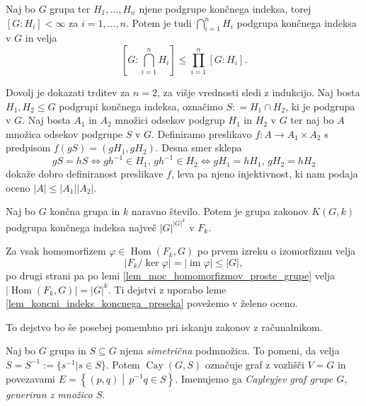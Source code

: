 \begin{lema}\label{lem_koncni_indeks_koncnega_preseka}
Naj bo $G$ grupa ter $H_1, \ldots, H_n$ njene podgrupe končnega indeksa, torej $[G: H_i] < \infty$ za $i = 1, \ldots, n$. Potem je tudi $\bigcap_{i = 1}^{n} H_i$ podgrupa končnega indeksa v $G$ in velja
\begin{equation*}
\left[ G: \bigcap_{i = 1}^{n} H_i \right]  \le \prod_{i=1}^{n} [G: H_i].  
\end{equation*} 
\end{lema}

\begin{dokaz}
Dovolj je dokazati trditev za $n = 2$, za višje vrednosti sledi z indukcijo. Naj bosta $H_1, H_2 \le G$ podgrupi končnega indeksa, označimo $S: = H_1 \cap H_2$, ki je podgrupa v $G$. Naj bosta $A_1$ in $A_2$ množici odsekov podgrup $H_1$ in $H_2$ v $G$ ter naj bo $A$ množica odsekov podgrupe $S$ v $G$.
 Definiramo preslikavo $f \colon A \to  A_1 \times A_2$ s predpisom $f(g S ) = (g H_1, g H_2)$. Desna smer sklepa \begin{equation*}
 g S = h S \iff gh^{-1} \in H_1, \, gh^{-1} \in H_2  \iff g H_1 = h H_1, \, g H_2 = h H_2
\end{equation*}  
dokaže dobro definiranost preslikave $f$, leva pa njeno injektivnost, ki nam podaja oceno $\lvert A \rvert \le  \lvert A_1 \rvert \lvert A_2 \rvert $.    
\end{dokaz}

\begin{posledica}
\label{psl_koncni_indeks_preseka}
Naj bo $G$ končna grupa in $k$ naravno število. Potem je grupa zakonov $K(G, k)$ podgrupa končnega indeksa največ $\lvert G \rvert^{ \lvert G \rvert^k}$ v $F_k$.
\end{posledica}
\begin{dokaz}
  Za vsak homomorfizem $\varphi \in \operatorname{Hom}(F_k, G)$ po prvem izreku o izomorfizmu velja \begin{equation*}
    \lvert F_k / \ker \varphi \rvert = \lvert \operatorname{im} \varphi \rvert \le \lvert G \rvert, 
\end{equation*}
po drugi strani pa po lemi \ref{lem_moc_homomorfizmov_proste_grupe} velja $\lvert \operatorname{Hom}(F_k, G) \rvert = \lvert G \rvert^k$. Ti dejstvi z uporabo leme \ref{lem_koncni_indeks_koncnega_preseka} povežemo v želeno oceno.
\end{dokaz}
To dejstvo bo še posebej pomembno pri iskanju zakonov z računalnikom.

\begin{definicija}
\label{def_cayleyev_graf}
Naj bo $G$ grupa in $S \subseteq G$ njena \emph{simetrična} podmnožica. To pomeni, da velja $S = S^{-1} := \{ s^{-1}  \vert s \in S  \}$. Potem $\operatorname{Cay}(G, S)$ označuje graf z vozlišči $V = G$ in povezavami
$E = \left\{ (p, q) \middle|\, p^{-1}q \in  S \right\}$. Imenujemo ga \emph{Cayleyjev graf grupe $G$, generiran z množico $S$}.  
\end{definicija}

